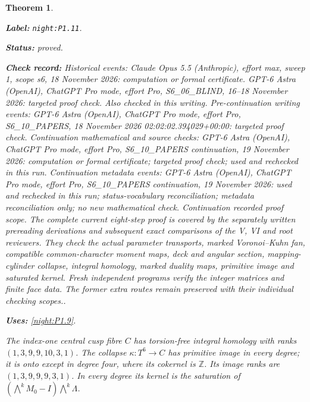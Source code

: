 \documentclass[11pt,a4paper]{article}
\newtheorem{theorem}{Theorem}[section]
\theoremstyle{definition}
\newcommand{\StatementRecord}[4]{\par\smallskip\begingroup\upshape\raggedright\noindent\textbf{Label:} \nolinkurl{#1}.\par\noindent\textbf{Status:} #2.\par\noindent\textbf{Check record:} #3.\par\noindent\textbf{Uses:} #4.\par\endgroup\smallskip}
\begin{document}
\begin{theorem}\label{night:P1.11}
\StatementRecord{night:P1.11}{proved}{Historical events: Claude Opus 5.5 (Anthropic), effort max, sweep 1, scope s6, 18 November 2026: computation or formal certificate. GPT-6 Astra (OpenAI), ChatGPT Pro mode, effort Pro, S6\_06\_BLIND, 16--18 November 2026: targeted proof check. Also checked in this writing. Pre-continuation writing events: GPT-6 Astra (OpenAI), ChatGPT Pro mode, effort Pro, S6\_10\_PAPERS, 18 November 2026 02:02:02.394029+00:00: targeted proof check. Continuation mathematical and source checks: GPT-6 Astra (OpenAI), ChatGPT Pro mode, effort Pro, S6\_10\_PAPERS continuation, 19 November 2026: computation or formal certificate; targeted proof check; used and rechecked in this run. Continuation metadata events: GPT-6 Astra (OpenAI), ChatGPT Pro mode, effort Pro, S6\_10\_PAPERS continuation, 19 November 2026: used and rechecked in this run; status-vocabulary reconciliation; metadata reconciliation only; no new mathematical check. \emph{Continuation recorded proof scope.} The complete current eight-step proof is covered by the separately written prereading derivations and subsequent exact comparisons of the V, VI and root reviewers. They check the actual parameter transports, marked Voronoi--Kuhn fan, compatible common-character moment maps, deck and angular section, mapping-cylinder collapse, integral homology, marked duality maps, primitive image and saturated kernel. Fresh independent programs verify the integer matrices and finite face data. The former extra routes remain preserved with their individual checking scopes.}{\cref{night:P1.9}}
The index-one central cusp fibre $C$ has torsion-free integral homology
with ranks $(1,3,9,9,10,3,1)$.
The collapse $\kappa:T^6\to C$ has primitive image in every degree;
it is onto except in degree four, where its cokernel is $\mathbb Z$.
Its image ranks are $(1,3,9,9,9,3,1)$.
In every degree its kernel is the saturation of
$(\bigwedge^kM_0-I)\bigwedge^k\Lambda$.
\end{theorem}
\end{document}
